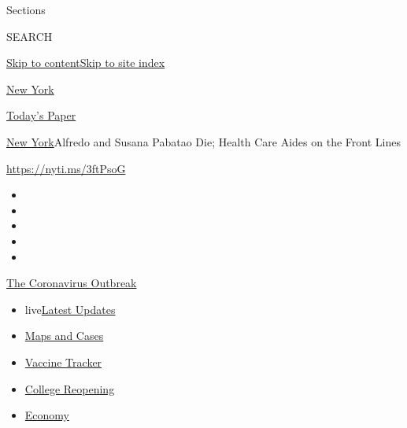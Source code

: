 Sections

SEARCH

\protect\hyperlink{site-content}{Skip to
content}\protect\hyperlink{site-index}{Skip to site index}

\href{https://www.nytimes.com/section/nyregion}{New York}

\href{https://myaccount.nytimes.com/auth/login?response_type=cookie\&client_id=vi}{}

\href{https://www.nytimes.com/section/todayspaper}{Today's Paper}

\href{/section/nyregion}{New York}\textbar{}Alfredo and Susana Pabatao
Die; Health Care Aides on the Front Lines

\url{https://nyti.ms/3ftPsoG}

\begin{itemize}
\item
\item
\item
\item
\item
\end{itemize}

\href{https://www.nytimes.com/news-event/coronavirus?action=click\&pgtype=Article\&state=default\&region=TOP_BANNER\&context=storylines_menu}{The
Coronavirus Outbreak}

\begin{itemize}
\tightlist
\item
  live\href{https://www.nytimes.com/2020/08/03/world/coronavirus-covid-19.html?action=click\&pgtype=Article\&state=default\&region=TOP_BANNER\&context=storylines_menu}{Latest
  Updates}
\item
  \href{https://www.nytimes.com/interactive/2020/us/coronavirus-us-cases.html?action=click\&pgtype=Article\&state=default\&region=TOP_BANNER\&context=storylines_menu}{Maps
  and Cases}
\item
  \href{https://www.nytimes.com/interactive/2020/science/coronavirus-vaccine-tracker.html?action=click\&pgtype=Article\&state=default\&region=TOP_BANNER\&context=storylines_menu}{Vaccine
  Tracker}
\item
  \href{https://www.nytimes.com/2020/08/02/us/covid-college-reopening.html?action=click\&pgtype=Article\&state=default\&region=TOP_BANNER\&context=storylines_menu}{College
  Reopening}
\item
  \href{https://www.nytimes.com/live/2020/08/03/business/stock-market-today-coronavirus?action=click\&pgtype=Article\&state=default\&region=TOP_BANNER\&context=storylines_menu}{Economy}
\end{itemize}

